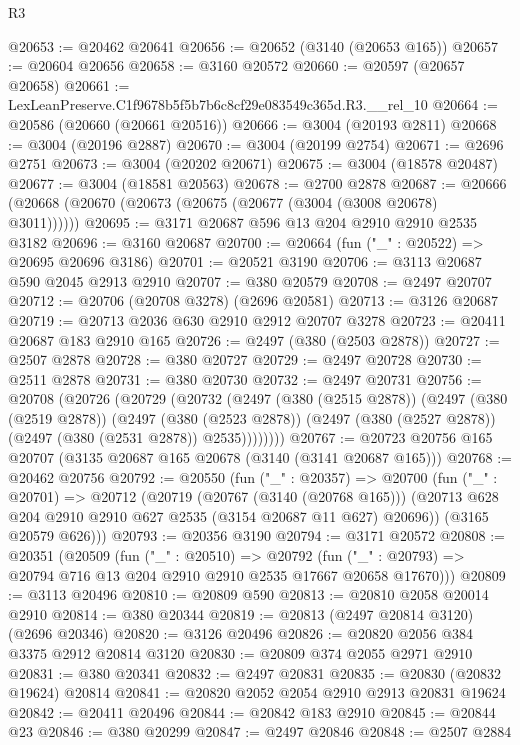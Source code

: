 \begin{lexlean}{R3}
\begin{coremodule}
@20653 := @20462 @20641
@20656 := @20652 (@3140 (@20653 @165))
@20657 := @20604 @20656
@20658 := @3160 @20572
@20660 := @20597 (@20657 @20658)
@20661 := LexLeanPreserve.C1f9678b5f5b7b6c8cf29e083549c365d.R3.__rel_10
@20664 := @20586 (@20660 (@20661 @20516))
@20666 := @3004 (@20193 @2811)
@20668 := @3004 (@20196 @2887)
@20670 := @3004 (@20199 @2754)
@20671 := @2696 @2751
@20673 := @3004 (@20202 @20671)
@20675 := @3004 (@18578 @20487)
@20677 := @3004 (@18581 @20563)
@20678 := @2700 @2878
@20687 := @20666 (@20668 (@20670 (@20673 (@20675 (@20677 (@3004 (@3008 @20678) @3011))))))
@20695 := @3171 @20687 @596 @13 @204 @2910 @2910 @2535 @3182
@20696 := @3160 @20687
@20700 := @20664 (fun ("_" : @20522) => @20695 @20696 @3186)
@20701 := @20521 @3190
@20706 := @3113 @20687 @590 @2045 @2913 @2910
@20707 := @380 @20579
@20708 := @2497 @20707
@20712 := @20706 (@20708 @3278) (@2696 @20581)
@20713 := @3126 @20687
@20719 := @20713 @2036 @630 @2910 @2912 @20707 @3278
@20723 := @20411 @20687 @183 @2910 @165
@20726 := @2497 (@380 (@2503 @2878))
@20727 := @2507 @2878
@20728 := @380 @20727
@20729 := @2497 @20728
@20730 := @2511 @2878
@20731 := @380 @20730
@20732 := @2497 @20731
@20756 := @20708
    (@20726
      (@20729
        (@20732
          (@2497
            (@380 (@2515 @2878))
            (@2497
              (@380 (@2519 @2878))
              (@2497
                (@380 (@2523 @2878))
                (@2497 (@380 (@2527 @2878)) (@2497 (@380 (@2531 @2878)) @2535))))))))
@20767 := @20723 @20756 @165 @20707 (@3135 @20687 @165 @20678 (@3140 (@3141 @20687 @165)))
@20768 := @20462 @20756
@20792 := @20550
    (fun ("_" : @20357) =>
    @20700
      (fun ("_" : @20701) =>
      @20712
        (@20719
          (@20767 (@3140 (@20768 @165)))
          (@20713 @628 @204 @2910 @2910 @627 @2535 (@3154 @20687 @11 @627) @20696))
        (@3165 @20579 @626)))
@20793 := @20356 @3190
@20794 := @3171 @20572
@20808 := @20351
    (@20509
      (fun ("_" : @20510) =>
      @20792 (fun ("_" : @20793) => @20794 @716 @13 @204 @2910 @2910 @2535 @17667 @20658 @17670)))
@20809 := @3113 @20496
@20810 := @20809 @590
@20813 := @20810 @2058 @20014 @2910
@20814 := @380 @20344
@20819 := @20813 (@2497 @20814 @3120) (@2696 @20346)
@20820 := @3126 @20496
@20826 := @20820 @2056 @384 @3375 @2912 @20814 @3120
@20830 := @20809 @374 @2055 @2971 @2910
@20831 := @380 @20341
@20832 := @2497 @20831
@20835 := @20830 (@20832 @19624) @20814
@20841 := @20820 @2052 @2054 @2910 @2913 @20831 @19624
@20842 := @20411 @20496
@20844 := @20842 @183 @2910
@20845 := @20844 @23
@20846 := @380 @20299
@20847 := @2497 @20846
@20848 := @2507 @2884

\end{coremodule}
\end{lexlean}
